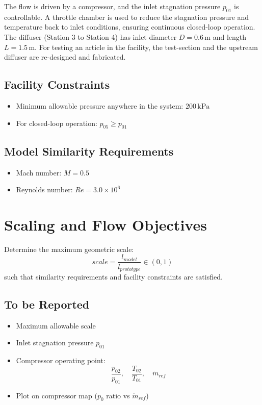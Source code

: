 \documentclass[12pt]{article}
\begin{document}
\vspace{1em}

\justifying
The flow is driven by a compressor, and the inlet stagnation pressure \( p_{01} \) is controllable. A throttle chamber is used to reduce the stagnation pressure and temperature back to inlet conditions, ensuring continuous closed-loop operation. The diffuser (Station 3 to Station 4) has inlet diameter \( D = 0.6\,\text{m} \) and length \( L = 1.5\,\text{m} \). For testing an article in
the facility, the test-section and the upstream diffuser are re-designed and
fabricated.

\subsection*{Facility Constraints}
\begin{itemize}
    \item Minimum allowable pressure anywhere in the system: \( 200\,\text{kPa} \)
    \item For closed-loop operation: \( p_{05} \geq p_{01} \)
\end{itemize}

\subsection*{Model Similarity Requirements}
\begin{itemize}
    \item Mach number: \( M = 0.5 \)
    \item Reynolds number: \( Re = 3.0 \times 10^6 \)
\end{itemize}


\section{\textcolor{myred}{Scaling and Flow Objectives}}
Determine the maximum geometric scale:
\[
scale = \frac{l_{model}}{l_{prototype}} \in (0,1)
\]
such that similarity requirements and facility constraints are satisfied.

\subsection*{To be Reported}
\begin{itemize}
    \item Maximum allowable scale
    \item Inlet stagnation pressure \( p_{01} \)
    \item Compressor operating point:
    \[
    \frac{p_{02}}{p_{01}}, \quad \frac{T_{02}}{T_{01}}, \quad \dot{m}_{ref}
    \]
    \item Plot on compressor map (\( p_0 \) ratio vs \( \dot{m}_{ref} \))
\end{itemize}
\end{document}
